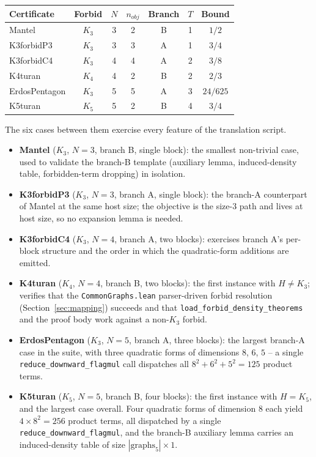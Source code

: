 \documentclass[11pt]{article}
\begin{document}
\begin{center}
\begin{tabular}{lcccccc}
\toprule
Certificate & Forbid & $N$ & $n_{\mathit{obj}}$ & Branch & $T$ & Bound \\
\midrule
Mantel               & $K_3$ & 3 & 2 & B & 1 & $1/2$    \\
K3forbidP3           & $K_3$ & 3 & 3 & A & 1 & $3/4$    \\
K3forbidC4           & $K_3$ & 4 & 4 & A & 2 & $3/8$    \\
K4turan              & $K_4$ & 4 & 2 & B & 2 & $2/3$    \\
ErdosPentagon        & $K_3$ & 5 & 5 & A & 3 & $24/625$ \\
K5turan              & $K_5$ & 5 & 2 & B & 4 & $3/4$    \\
\bottomrule
\end{tabular}
\end{center}

The six cases between them exercise every feature of the translation
script.
\begin{itemize}
  \item \textbf{Mantel} ($K_3$, $N{=}3$, branch B, single block): the
    smallest non-trivial case, used to validate the branch-B template
    (auxiliary lemma, induced-density table, forbidden-term dropping)
    in isolation.
  \item \textbf{K3forbidP3} ($K_3$, $N{=}3$, branch A, single block):
    the branch-A counterpart of Mantel at the same host size; the
    objective is the size-$3$ path and lives at host size, so no
    expansion lemma is needed.
  \item \textbf{K3forbidC4} ($K_3$, $N{=}4$, branch A, two blocks):
    exercises branch A's per-block structure and the order in which the
    quadratic-form additions are emitted.
  \item \textbf{K4turan} ($K_4$, $N{=}4$, branch B, two blocks): the
    first instance with $H \ne K_3$; verifies that the
    \texttt{CommonGraphs.lean} parser-driven forbid resolution
    (Section~\ref{sec:mapping}) succeeds and that
    \texttt{load\_forbid\_density\_theorems} and the proof body work
    against a non-$K_3$ forbid.
  \item \textbf{ErdosPentagon} ($K_3$, $N{=}5$, branch A, three blocks):
    the largest branch-A case in the suite, with three quadratic forms
    of dimensions $8$, $6$, $5$ -- a single
    \texttt{reduce\_downward\_flagmul} call dispatches all
    $8^2 + 6^2 + 5^2 = 125$ product terms.
  \item \textbf{K5turan} ($K_5$, $N{=}5$, branch B, four blocks): the
    first instance with $H = K_5$, and the largest case overall. Four
    quadratic forms of dimension $8$ each yield $4 \times 8^2 = 256$
    product terms, all dispatched by a single
    \texttt{reduce\_downward\_flagmul}, and the branch-B auxiliary
    lemma carries an induced-density table of size $|\text{graphs}_5|
    \times 1$.
\end{itemize}
\end{document}
